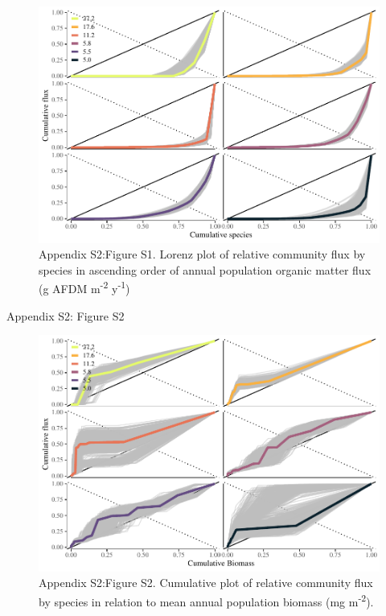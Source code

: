 \documentclass[
]{article}
\numberwithin{equation}
\begin{document}
\begin{figure}
\centering
\includegraphics{Junker_temp-energy-flux_appendixS2_files/figure-latex/raw lorenz-1.pdf}
\caption{Appendix S2:Figure S1. Lorenz plot of relative community flux
by species in ascending order of annual population organic matter flux
(g AFDM m\textsuperscript{-2} y\textsuperscript{-1})}
\end{figure}

\newpage

Appendix S2: Figure S2

\begin{figure}
\centering
\includegraphics{Junker_temp-energy-flux_appendixS2_files/figure-latex/biomass lorenz-1.pdf}
\caption{Appendix S2:Figure S2. Cumulative plot of relative community
flux by species in relation to mean annual population biomass (mg
m\textsuperscript{-2}).}
\end{figure}
\end{document}
